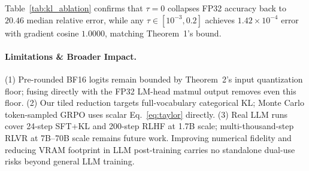 \documentclass[10pt,twocolumn]{article}
\begin{document}
Table~\ref{tab:kl_ablation} confirms that $\tau=0$ collapses FP32 accuracy back to $20.46$ median relative error, while any $\tau \in [10^{-3}, 0.2]$ achieves $1.42\times 10^{-4}$ error with gradient cosine $1.0000$, matching Theorem~1's bound.
\paragraph{Limitations \& Broader Impact.} (1) Pre-rounded BF16 logits remain bounded by Theorem~2's input quantization floor; fusing directly with the FP32 LM-head matmul output removes even this floor. (2) Our tiled reduction targets full-vocabulary categorical KL; Monte Carlo token-sampled GRPO uses scalar Eq.~\eqref{eq:taylor} directly. (3) Real LLM runs cover 24-step SFT+KL and 200-step RLHF at 1.7B scale; multi-thousand-step RLVR at 7B--70B scale remains future work. Improving numerical fidelity and reducing VRAM footprint in LLM post-training carries no standalone dual-use risks beyond general LLM training.



\end{document}
